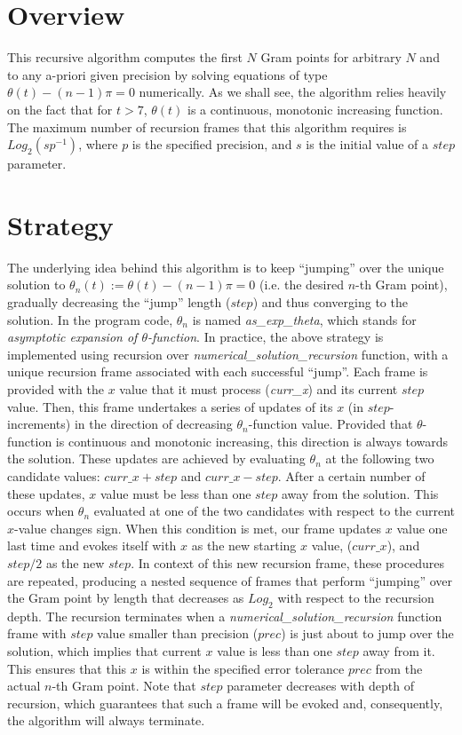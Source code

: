 \documentclass[a4paper]{article}
\begin{document}
\section{Overview}
This recursive algorithm computes the first $N$ Gram points for arbitrary $N$ and to any a-priori given precision by solving equations of type $\theta(t)-(n-1)\pi=0$ numerically. As we shall see, the algorithm relies heavily on the fact that for $t>7$, $\theta(t)$ is a continuous, monotonic increasing function. The maximum number of recursion frames that this algorithm requires is $Log_2(sp^{-1})$, where $p$ is the specified precision, and $s$ is the initial value of a $step$ parameter.

\section{Strategy}
The underlying idea behind this algorithm is to keep ``jumping'' over the unique solution to $\theta_n(t):=\theta(t)-(n-1)\pi=0$ (i.e. the desired $n$-th Gram point), gradually decreasing the ``jump'' length ($step$) and thus converging to the solution. In the program code, $\theta_n$ is named  \textit{as\_exp\_theta}, which stands for \textit{asymptotic expansion of $\theta$-function}. In practice, the above strategy is implemented using recursion over \textit{numerical\_solution\_recursion} function, with a unique recursion frame associated with each successful ``jump''. Each frame is provided with the $x$ value that it must process (\textit{curr\_x}) and its current $step$ value. Then, this frame undertakes a series of updates of its $x$ (in $step$-increments) in the direction of decreasing $\theta_n$-function value. Provided that $\theta$-function is continuous and monotonic increasing, this direction is always towards the solution. These updates are achieved by evaluating $\theta_n$ at the following two candidate values: $curr\_x+step$ and $curr\_x-step$.  After a certain number of these updates, $x$ value must be less than one $step$ away from the solution. This occurs when $\theta_n$ evaluated at one of the two candidates with respect to the current $x$-value changes sign. When this condition is met, our frame updates $x$ value one last time and evokes itself with $x$ as the new starting $x$ value, ($curr\_x$), and $step/2$ as the new $step$. In context of this new recursion frame, these procedures are repeated, producing a nested sequence of frames that perform ``jumping'' over the Gram point by length that decreases as $Log_2$ with respect to the recursion depth. The recursion terminates when a \textit{numerical\_solution\_recursion} function frame with $step$ value smaller than precision ($prec$) is just about to jump over the solution, which implies that current $x$ value is less than one $step$ away from it. This ensures that this $x$ is within the specified error tolerance $prec$ from the actual $n$-th Gram point. Note that $step$ parameter decreases with depth of recursion, which guarantees that such a frame will be evoked and, consequently, the algorithm will always terminate.
\end{document}
